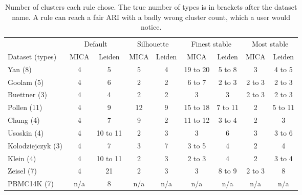 \begin{table}[t]
\centering
\caption{Number of clusters each rule chose. The true number of types is in brackets after the dataset name. A rule can reach a fair ARI with a badly wrong cluster count, which a user would notice.}
\label{tab:clusters}
\scriptsize
\setlength{\tabcolsep}{3pt}
\begin{tabular}{lcccccccc}
\toprule
 & \multicolumn{2}{c}{Default} & \multicolumn{2}{c}{Silhouette} & \multicolumn{2}{c}{Finest stable} & \multicolumn{2}{c}{Most stable} \\
\cmidrule(lr){2-3}\cmidrule(lr){4-5}\cmidrule(lr){6-7}\cmidrule(lr){8-9}
Dataset (types) & MICA & Leiden & MICA & Leiden & MICA & Leiden & MICA & Leiden \\
\midrule
Yan (8) & 4 & 5 & 5 & 4 & 19 to 20 & 5 to 8 & 3 & 4 to 5 \\
Goolam (5) & 4 & 6 & 2 & 2 & 6 to 7 & 2 to 3 & 2 to 3 & 2 to 3 \\
Buettner (3) & 4 & 4 & 2 & 2 & 3 & 3 & 2 to 3 & 2 to 3 \\
Pollen (11) & 4 & 9 & 12 & 9 & 15 to 18 & 7 to 11 & 2 & 5 to 11 \\
Chung (4) & 4 & 7 & 9 & 2 & 11 to 12 & 3 to 4 & 2 & 3 \\
Usoskin (4) & 4 & 10 to 11 & 2 & 3 & 3 & 6 & 3 & 3 to 6 \\
Kolodziejczyk (3) & 4 & 7 & 3 & 7 & 3 to 5 & 4 & 2 & 4 \\
Klein (4) & 4 & 10 to 11 & 2 & 3 & 2 to 3 & 4 & 2 & 3 to 4 \\
Zeisel (7) & 4 & 21 & 2 & 3 & 3 & 8 to 9 & 2 to 3 & 8 \\
PBMC14K (7) & n/a & 8 & n/a & n/a & n/a & n/a & n/a & n/a \\
\bottomrule
\end{tabular}
\end{table}
